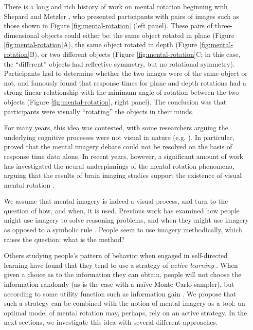 \documentclass{article} %
\newcommand{\naive}[0]{na\"ive}
\begin{document}
There is a long and rich history of work on mental rotation beginning
with Shepard and Metzler \cite{Shepard1971}, who presented
participants with pairs of images such as those shown in Figure
\ref{fig:mental-rotation} (left panel). These pairs of
three-dimensional objects could either be: the same object rotated in
plane (Figure \ref{fig:mental-rotation}A), the same object rotated in
depth (Figure \ref{fig:mental-rotation}B), or two different objects
(Figure \ref{fig:mental-rotation}C; in this case, the ``different''
objects had reflective symmetry, but no rotational
symmetry). Participants had to determine whether the two images were
of the same object or not, and \cite{Shepard1971} famously found that
response times for plane and depth rotations had a strong linear
relationship with the minimum angle of rotation between the two
objects (Figure \ref{fig:mental-rotation}, right panel). The
conclusion was that participants were visually ``rotating'' the
objects in their minds.

For many years, this idea was contested, with some researchers arguing
the underlying cognitive processes were not visual in nature
(e.g. \cite{Pylyshyn1981}). In particular, \cite{Anderson1978} proved
that the mental imagery debate could not be resolved on the basis of
response time data alone. In recent years, however, a significant
amount of work has investigated the neural underpinnings of the mental
rotation phenomena, arguing that the results of brain imaging studies
support the existence of visual mental rotation \cite{Kosslyn1988,
  Kosslyn:2009tj}.

We assume that mental imagery is indeed a visual process, and turn to
the question of how, and when, it is used. Previous work has examined
how people might use imagery \cite{Hegarty2004, Schwartz1999} to solve
reasoning problems, and when they might use imagery as opposed to a
symbolic rule \cite{Schwartz:1996uy}. People seem to use imagery
methodically, which raises the question: what is the method?

Others studying people's pattern of behavior when engaged in
self-directed learning have found that they tend to use a strategy of
\textit{active learning} \cite{Gureckis:2012gu, Markant:2012uu}. When
given a choice as to the information they can obtain, people will not
choose the information randomly (as is the case with a \naive{} Monte
Carlo sampler), but according to some utility function such as
information gain \cite{Nelson2007, Markant:2012uu}. We propose that
such a strategy can be combined with the notion of mental imagery as a
tool: an optimal model of mental rotation may, perhaps, rely on an
active strategy. In the next sections, we investigate this idea with
several different approaches.
\end{document}
